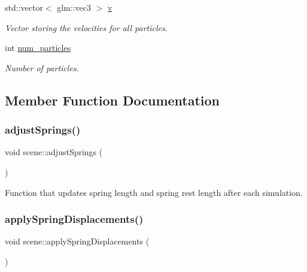 \begin{DoxyCompactItemize}
std\+::vector$<$ glm\+::vec3 $>$ \hyperlink{classscene_a38b4ab71581c6d43e6e565f366cd18a6}{v}
\begin{DoxyCompactList}\small\item\em Vector storing the velocities for all particles. \end{DoxyCompactList}\item 
int \hyperlink{classscene_a193bc997bddf91dbd027a9fb0d37355d}{num\+\_\+particles}
\begin{DoxyCompactList}\small\item\em Number of particles. \end{DoxyCompactList}\end{DoxyCompactItemize}


\subsection{Member Function Documentation}
\hypertarget{classscene_a6f4e28c2ad9fc020475e837ae931166b}{}\label{classscene_a6f4e28c2ad9fc020475e837ae931166b} 
\subsubsection{\texorpdfstring{adjust\+Springs()}{adjustSprings()}}
{\footnotesize\ttfamily void scene\+::adjust\+Springs (\begin{DoxyParamCaption}{ }\end{DoxyParamCaption})}



Function that updates spring length and spring rest length after each simulation. 

\hypertarget{classscene_a17b6f5ee5354a688db7506f68d77623e}{}\label{classscene_a17b6f5ee5354a688db7506f68d77623e} 
\subsubsection{\texorpdfstring{apply\+Spring\+Displacements()}{applySpringDisplacements()}}
{\footnotesize\ttfamily void scene\+::apply\+Spring\+Displacements (\begin{DoxyParamCaption}{ }\end{DoxyParamCaption})}



